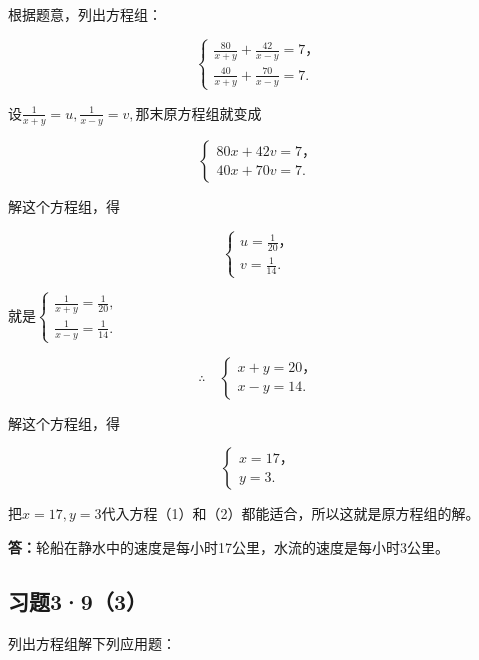 根据题意，列出方程组：

\[
\left\{ \begin{array}{l} \frac{80}{x + y} + \frac{42}{x - y} = 7\text{，} \\ \frac{40}{x + y} + \frac{70}{x - y} = 7. \end{array} \right. \tag{1}
\]

设\(\frac{1}{x + y} = u, \frac{1}{x - y} = v,\)那末原方程组就变成

\[
\left\{ \begin{array}{l} 80 x + 42 v = 7\text{，} \\ 40 x + 70 v = 7. \end{array} \right.
\]

解这个方程组，得

\[
\left\{ \begin{array}{l} u = \frac{1}{20}\text{，} \\ v = \frac{1}{14}. \end{array} \right.
\]

就是\(\left\{ \begin{array}{l} \frac{1}{x + y} = \frac{1}{20}, \\ \frac{1}{x - y} = \frac{1}{14}. \end{array} \right.\)

\[
\therefore \quad \left\{ \begin{array}{l} x + y = 20\text{，} \\ x - y = 14. \end{array} \right.
\]

解这个方程组，得

\[
\left\{ \begin{array}{l} x = 17\text{，} \\ y = 3. \end{array} \right.
\]

把\(x = 17, y = 3\)代入方程（1）和（2）都能适合，所以这就是原方程组的解。

\textbf{答：}轮船在静水中的速度是每小时17公里，水流的速度是每小时3公里。

\subsection{习题3·9（3）}

列出方程组解下列应用题：

